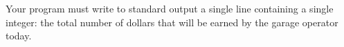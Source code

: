 Your program must write to standard output a single line containing a single integer: the total number of dollars that will be earned by the garage operator today. 